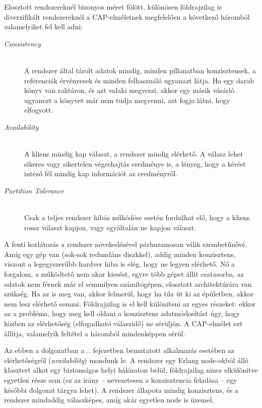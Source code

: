 \documentclass[12pt, a4paper, oneside]{book}
\begin{document}
Elosztott rendszereknél bizonyos méret fölött, különösen földrajzilag is
diverzifikált rendszereknél a CAP-elméletnek megfelelően a következő háromból
valamelyiket fel kell adni:
\begin{description}
\item[\emph{Consistency}] \hfill \\
 A rendszer által tárolt adatok mindig, minden pillanatban konzisztensek, a
referenciák érvényesek és minden felhasználó ugyanazt látja. Ha egy darab könyv
van raktáron, és azt valaki megveszi, akkor egy másik vásárló ugyanezt a
könyvet már nem tudja megvenni, azt fogja látni, hogy elfogyott.

\item[\emph{Availability}] \hfill \\
  A kliens mindig kap választ, a rendszer mindig elérhető. A válasz lehet
sikeres vagy sikertelen végrehajtás eredménye is, a lényeg, hogy a kérést
intéző fél mindig kap információt az eredményről.

\item[\emph{Partition Tolerance}] \hfill \\
 Csak a teljes rendszer hibás működése esetén fordulhat elő, hogy a kliens
rossz választ kapjon, vagy egyáltalán ne kapjon választ.
\end{description}

\noindent A fenti korlátozás a rendszer növekedésével párhuzamosan válik
szembetűnővé. Amíg egy gép van (sok-sok redundáns diszkkel), addig minden
konzisztens, viszont a legegyszerűbb hardver hiba is elég, hogy ne legyen
elérhető. Nő a forgalom, a működtető nem akar kiesést, egyre több gépet állít
csatasorba, az adatok nem férnek már el semmilyen számítógépen, elosztott
architektúrára van szükség. Ha az is meg van, akkor felmerül, hogy ha tűz üt ki
az épületben, akkor nem lesz elérhető semmi. Földrajzilag is el kell különíteni
az egyes részeket: ekkor az a probléma, hogy meg kell oldani a konzisztens
adatmódosítást úgy, hogy közben az elérhetőség (elfogadható válaszidő) ne
sérüljön. A CAP-elmélet ezt állítja, valamelyik feltétel a háromból
mindenképpen sérül.

Az ebben a dolgozatban a .. fejezetben bemutatott alkalmazás esetében az
elérhetőségről (\emph{availability}) mondunk le. A rendszer egy Erlang
node-okból álló klasztert alkot egy biztonságos helyi hálózaton belül,
földrajzilag nincs elkülönítve egyetlen része sem (ez az irány -- nevezetesen a
konzisztencia feladása -- egy későbbi dolgozat tárgya lehet). A rendszer
állapota mindig konzisztens, és a rendszer mindaddig válaszképes, amíg akár
egyetlen node is üzemel.
\end{document}

